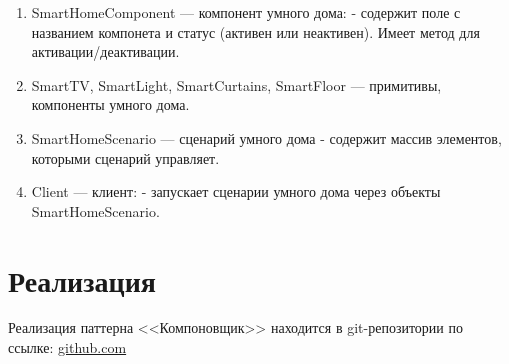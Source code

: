 \documentclass[PI,LAB]{HSEUniversity}
\begin{document}
\begin{enumerate}
  \item SmartHomeComponent --- компонент умного дома: - содержит поле с названием компонета и статус (активен или неактивен). Имеет метод для активации/деактивации. 
  \item SmartTV, SmartLight, SmartCurtains, SmartFloor --- примитивы, компоненты умного дома. 
  \item SmartHomeScenario --- сценарий умного дома - содержит массив элементов, которыми сценарий управляет.
  \item Client --- клиент: - запускает сценарии умного дома через объекты SmartHomeScenario.
\end{enumerate}

\section{Реализация}
Реализация паттерна <<Компоновщик>> находится в git-репозитории по ссылке: \href{https://github.com/rovany706/design-patterns/}{github.com}
\end{document}
